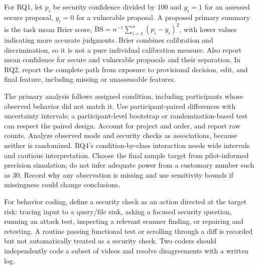 \documentclass[12pt,a4paper]{article}
\begin{document}
For RQ1, let $p_i$ be security confidence divided by 100 and $y_i=1$ for an assessed secure proposal, $y_i=0$ for a vulnerable proposal. A proposed primary summary is the task mean Brier score, $\mathrm{BS}=n^{-1}\sum_{i=1}^{n}(p_i-y_i)^2$, with lower values indicating more accurate judgments. Brier combines calibration and discrimination, so it is not a pure individual calibration measure. Also report mean confidence for secure and vulnerable proposals and their separation. In RQ2, report the complete path from exposure to provisional decision, edit, and final feature, including missing or unassessable features.

The primary analysis follows assigned condition, including participants whose observed behavior did not match it. Use participant-paired differences with uncertainty intervals; a participant-level bootstrap or randomization-based test can respect the paired design. Account for project and order, and report raw counts. Analyze observed mode and security checks as associations, because neither is randomized. RQ4's condition-by-class interaction needs wide intervals and cautious interpretation. Choose the final sample target from pilot-informed precision simulation; do not infer adequate power from a customary number such as 30. Record why any observation is missing and use sensitivity bounds if missingness could change conclusions.

For behavior coding, define a security check as an action directed at the target risk: tracing input to a query/file sink, asking a focused security question, running an attack test, inspecting a relevant scanner finding, or repairing and retesting. A routine passing functional test or scrolling through a diff is recorded but not automatically treated as a security check. Two coders should independently code a subset of videos and resolve disagreements with a written log.
\end{document}
